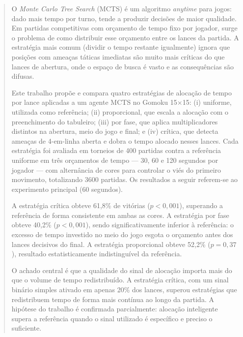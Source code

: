 \documentclass[cic,tc]{iiufrgs}
\begin{document}
\begin{abstract}
O \emph{Monte Carlo Tree Search} (MCTS) é um algoritmo \emph{anytime} para jogos: dado mais tempo por turno, tende a produzir decisões de maior qualidade. Em partidas competitivas com orçamento de tempo fixo por jogador, surge o problema de como distribuir esse orçamento entre os lances da partida. A estratégia mais comum (dividir o tempo restante igualmente) ignora que posições com ameaças táticas imediatas são muito mais críticas do que lances de abertura, onde o espaço de busca é vasto e as consequências são difusas.

Este trabalho propõe e compara quatro estratégias de alocação de tempo por lance aplicadas a um agente MCTS no Gomoku 15×15: (i) uniforme, utilizada como referência; (ii) proporcional, que escala a alocação com o preenchimento do tabuleiro; (iii) por fase, que aplica multiplicadores distintos na abertura, meio do jogo e final; e (iv) crítica, que detecta ameaças de 4-em-linha aberta e dobra o tempo alocado nesses lances. Cada estratégia foi avaliada em torneios de 400 partidas contra a referência uniforme em três orçamentos de tempo — 30, 60 e 120 segundos por jogador — com alternância de cores para controlar o viés do primeiro movimento, totalizando 3600 partidas. Os resultados a seguir referem-se ao experimento principal (60 segundos).

A estratégia crítica obteve 61,8\% de vitórias ($p < 0{,}001$), superando a referência de forma consistente em ambas as cores. A estratégia por fase obteve 40,2\% ($p < 0{,}001$), sendo significativamente inferior à referência: o excesso de tempo investido no meio do jogo esgota o orçamento antes dos lances decisivos do final. A estratégia proporcional obteve 52,2\% ($p = 0{,}37$), resultado estatisticamente indistinguível da referência.

O achado central é que a qualidade do sinal de alocação importa mais do que o volume de tempo redistribuído. A estratégia crítica, com um sinal binário simples ativado em apenas 20\% dos lances, superou estratégias que redistribuem tempo de forma mais contínua ao longo da partida. A hipótese do trabalho é confirmada parcialmente: alocação inteligente supera a referência quando o sinal utilizado é específico e preciso o suficiente.
\end{abstract}
\end{document}
